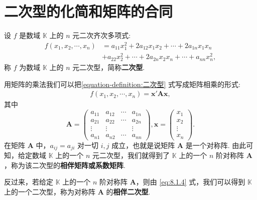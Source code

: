 \documentclass[../../main.tex]{subfiles}
\begin{document}
\section{二次型的化简和矩阵的合同}

\begin{definition}[二次型]\label{definition:二次型}
设 $f$ 是数域 $\mathbb{K}$ 上的 $n$ 元二次齐次多项式:
\begin{align}\label{equation-definition:二次型}
f(x_1,x_2,\cdots,x_n)&=a_{11}x_1^2 + 2a_{12}x_1x_2+\cdots + 2a_{1n}x_1x_n\\
&+a_{22}x_2^2+\cdots + 2a_{2n}x_2x_n+\cdots + a_{nn}x_n^2,
\end{align}
称 $f$ 为数域 $\mathbb{K}$ 上的 $n$ 元二次型，简称\textbf{二次型}. 
\end{definition}

\begin{definition}[二次型与矩阵的相伴]\label{definition:二次型与矩阵的相伴}
用矩阵的乘法我们可以把\eqref{equation-definition:二次型} 式写成矩阵相乘的形式:
\begin{align}
f(x_1,x_2,\cdots,x_n)=\boldsymbol{x}'\boldsymbol{A}\boldsymbol{x},\label{eq:8.1.4}
\end{align}
其中
\[
\boldsymbol{A}=\begin{pmatrix}
a_{11} & a_{12} & \cdots & a_{1n} \\
a_{21} & a_{22} & \cdots & a_{2n} \\
\vdots & \vdots & & \vdots \\
a_{n1} & a_{n2} & \cdots & a_{nn}
\end{pmatrix}, \boldsymbol{x}=\begin{pmatrix}
x_1 \\
x_2 \\
\vdots \\
x_n
\end{pmatrix}.
\]
在矩阵 $\boldsymbol{A}$ 中，$a_{ij}=a_{ji}$ 对一切 $i,j$ 成立，也就是说矩阵 $\boldsymbol{A}$ 是一个对称阵. 由此可知，给定数域 $\mathbb{K}$ 上的一个 $n$ 元二次型，我们就得到了 $\mathbb{K}$ 上的一个 $n$ 阶对称阵 $\boldsymbol{A}$，称为该二次型的\textbf{相伴矩阵或系数矩阵}.

反过来，若给定 $\mathbb{K}$ 上的一个 $n$ 阶对称阵 $\boldsymbol{A}$，则由 \eqref{eq:8.1.4} 式，我们可以得到 $\mathbb{K}$ 上的一个二次型，称为对称阵 $\boldsymbol{A}$ 的\textbf{相伴二次型}.
\end{definition}
\end{document}
